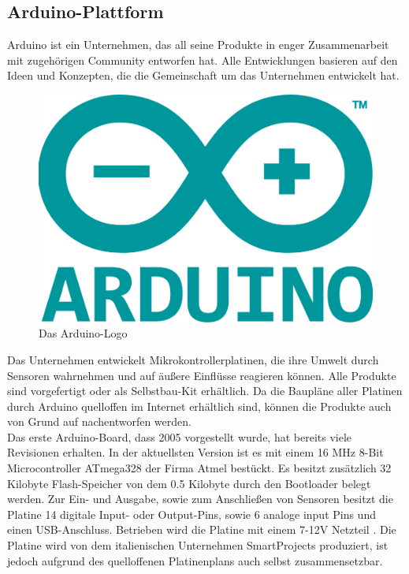 \subsection{Arduino-Plattform}\label{ss:Arduino}

Arduino ist ein Unternehmen, das all seine Produkte in enger Zusammenarbeit mit zugehörigen Community entworfen hat. Alle Entwicklungen basieren auf den Ideen und Konzepten, die die Gemeinschaft um das Unternehmen entwickelt hat. 

\begin{figure}[H] 
	\centering
	\includegraphics[scale=0.2]{Bilder/arduino}
	\caption{Das Arduino-Logo\cite{i:arduino}}
	\label{f:arduino}
\end{figure}

Das Unternehmen entwickelt Mikrokontrollerplatinen, die ihre Umwelt durch Sensoren wahrnehmen und auf äußere Einflüsse reagieren können. Alle Produkte sind vorgefertigt oder als Selbstbau-Kit erhältlich. Da die Baupläne aller Platinen durch Arduino quelloffen im Internet erhältlich sind, können die Produkte auch von Grund auf nachentworfen werden.\\

Das erste Arduino-Board, dass 2005 vorgestellt wurde, hat bereits viele Revisionen erhalten. In der aktuellsten Version ist es mit einem 16 \ac{MHz} 8-Bit Microcontroller ATmega328 der Firma Atmel bestückt. Es besitzt zusätzlich 32 Kilobyte Flash-Speicher von dem 0.5 Kilobyte durch den Bootloader belegt werden. Zur Ein- und Ausgabe, sowie zum Anschließen von Sensoren besitzt die Platine 14 digitale Input- oder Output-Pins, sowie 6 analoge input Pins und einen \ac{USB}-Anschluss. Betrieben wird die Platine mit einem 7-12V Netzteil \cite{ws:arduinouno}.
Die Platine wird von dem italienischen Unternehmen SmartProjects produziert, ist jedoch aufgrund des quelloffenen Platinenplans auch selbst zusammensetzbar.\\

